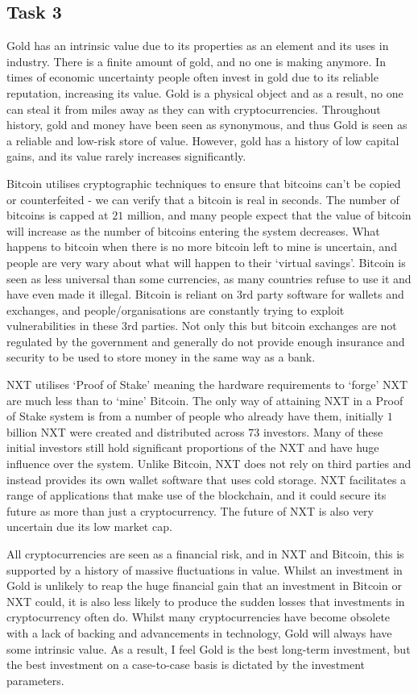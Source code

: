 \documentclass[12pt, a4paper]{article}
\begin{document}
\subsection*{Task 3}
\hspace{\parindent} Gold has an intrinsic value due to its properties as an element and its uses in industry. There is a finite amount of gold, and no one is making anymore. In times of economic uncertainty people often invest in gold due to its reliable reputation, increasing its value. Gold is a physical object and as a result, no one can steal it from miles away as they can with cryptocurrencies. Throughout history, gold and money have been seen as synonymous, and thus Gold is seen as a reliable and low-risk store of value. However, gold has a history of low capital gains, and its value rarely increases significantly.
\par Bitcoin utilises cryptographic techniques to ensure that bitcoins can't be copied or counterfeited - we can verify that a bitcoin is real in seconds. The number of bitcoins is capped at $21$ million, and many people expect that the value of bitcoin will increase as the number of bitcoins entering the system decreases. What happens to bitcoin when there is no more bitcoin left to mine is uncertain, and people are very wary about what will happen to their `virtual savings'. Bitcoin is seen as less universal than some currencies, as many countries refuse to use it and have even made it illegal. Bitcoin is reliant on 3rd party software for wallets and exchanges, and people/organisations are constantly trying to exploit vulnerabilities in these 3rd parties. Not only this but bitcoin exchanges are not regulated by the government and generally do not provide enough insurance and security to be used to store money in the same way as a bank.
\par NXT utilises `Proof of Stake’ meaning the hardware requirements to `forge' NXT are much less than to `mine’ Bitcoin. The only way of attaining NXT in a Proof of Stake system is from a number of people who already have them, initially $1$ billion NXT were created and distributed across $73$ investors. Many of these initial investors still hold significant proportions of the NXT and have huge influence over the system. Unlike Bitcoin, NXT does not rely on third parties and instead provides its own wallet software that uses cold storage. NXT facilitates a range of applications that make use of the blockchain, and it could secure its future as more than just a cryptocurrency. The future of NXT is also very uncertain due its low market cap.
\par All cryptocurrencies are seen as a financial risk, and in NXT and Bitcoin, this is supported by a history of massive fluctuations in value. Whilst an investment in Gold is unlikely to reap the huge financial gain that an investment in Bitcoin or NXT could, it is also less likely to produce the sudden losses that investments in cryptocurrency often do. Whilst many cryptocurrencies have become obsolete with a lack of backing and advancements in technology, Gold will always have some intrinsic value. As a result, I feel Gold is the best long-term investment, but the best investment on a case-to-case basis is dictated by the investment parameters.
\end{document}
